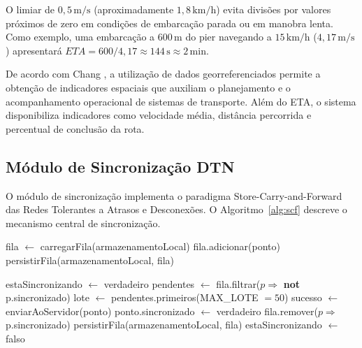 \documentclass[12pt]{article}
\begin{document}
O limiar de $0{,}5\,\text{m/s}$ (aproximadamente $1{,}8\,\text{km/h}$) evita divisões por valores próximos de zero em condições de embarcação parada ou em manobra lenta. Como exemplo, uma embarcação a $600\,\text{m}$ do pier navegando a $15\,\text{km/h}$ ($4{,}17\,\text{m/s}$) apresentará $ETA = 600 / 4{,}17 \approx 144\,\text{s} \approx 2\,\text{min}$.

De acordo com Chang \cite{chang2018gis}, a utilização de dados georreferenciados permite a obtenção de indicadores espaciais que auxiliam o planejamento e o acompanhamento operacional de sistemas de transporte. Além do ETA, o sistema disponibiliza indicadores como velocidade média, distância percorrida e percentual de conclusão da rota.

\subsection{Módulo de Sincronização DTN}
O módulo de sincronização implementa o paradigma Store-Carry-and-Forward das Redes Tolerantes a Atrasos e Desconexões. O Algoritmo~\ref{alg:scf} descreve o mecanismo central de sincronização.

\begin{algorithm}[H]
\caption{Store-Carry-and-Forward -- Sincronização Oportunística}
\label{alg:scf}
\begin{algorithmic}[1]
    \State fila $\leftarrow$ carregarFila(armazenamentoLocal)
                        
        \State fila.adicionar(ponto)                
        \State persistirFila(armazenamentoLocal, fila)
    \EndIf
        \State {}         
    \EndIf
\EndProcedure

\Statex
{}
     \Return \EndIf
    \State estaSincronizando $\leftarrow$ verdadeiro
    \State pendentes $\leftarrow$ fila.filtrar($p \Rightarrow$ \textbf{not} p.sincronizado)
     \Return \EndIf
    \State lote $\leftarrow$ pendentes.primeiros(MAX\_LOTE $= 50$)
        \State sucesso $\leftarrow$ enviarAoServidor(ponto)
            \State ponto.sincronizado $\leftarrow$ verdadeiro
        \EndIf
    \EndFor
    \State fila.remover($p \Rightarrow$ p.sincronizado)
    \State persistirFila(armazenamentoLocal, fila)
    \State estaSincronizando $\leftarrow$ falso
\EndProcedure
\end{algorithmic}
\end{algorithm}
\end{document}

